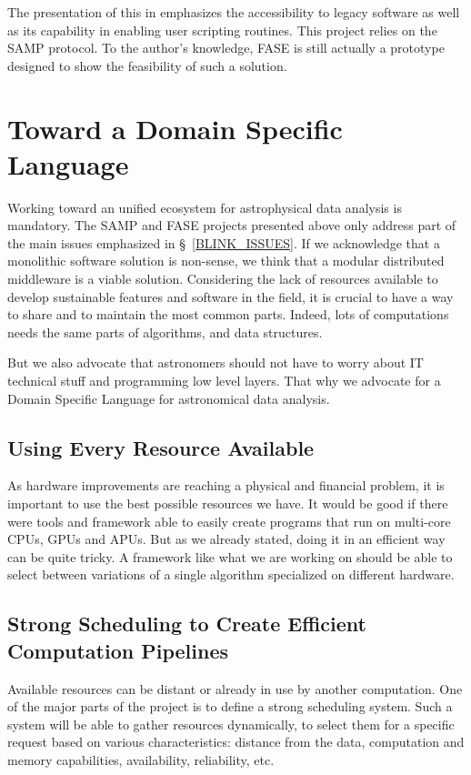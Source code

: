 			The presentation of this in \citet{Grosbol} emphasizes the accessibility to legacy software as well as its capability in enabling user scripting routines.
			This project relies on the SAMP protocol.
			To the author's knowledge, FASE is still actually a prototype designed to show the feasibility of such a solution.

	\section{Toward a Domain Specific Language}
		Working toward an unified ecosystem for astrophysical data analysis is mandatory.
		The SAMP and FASE projects presented above only address part of the main issues emphasized in \S~\ref{BLINK_ISSUES}.
		If we acknowledge that a monolithic software solution is non-sense, we think that a modular distributed middleware is a viable solution.
		Considering the lack of resources available to develop sustainable features and software in the field, it is crucial to have a way to share and to maintain the most common parts.
		Indeed, lots of computations needs the same parts of algorithms, and data structures.
		
		But we also advocate that astronomers should not have to worry about IT technical stuff and programming low level layers.
		That why we advocate for a Domain Specific Language for astronomical data analysis.

		\subsection{Using Every Resource Available}
			As hardware improvements are reaching a physical and financial problem, it is important to use the best possible resources we have.
			It would be good if there were tools and framework able to easily create programs that run on multi-core CPUs, GPUs and APUs.
			But as we already stated, doing it in an efficient way can be quite tricky.
			A framework like what we are working on should be able to select between variations of a single algorithm specialized on different hardware.

		\subsection{Strong Scheduling to Create Efficient Computation Pipelines}
			Available resources can be distant or already in use by another computation.
			One of the major parts of the project is to define a strong scheduling system.
			Such a system will be able to gather resources dynamically, to select them for a specific request based on various characteristics: distance from the data, computation and memory capabilities, availability, reliability, etc.
			
